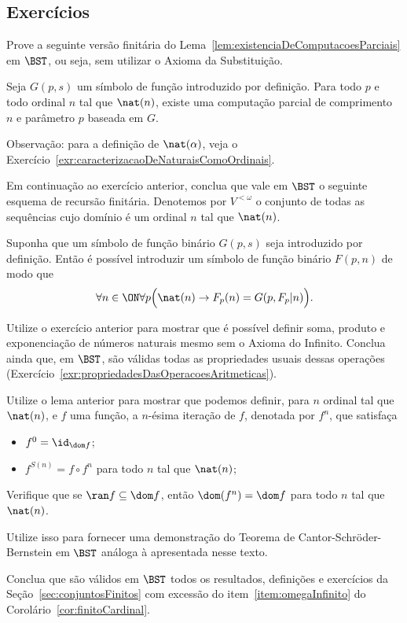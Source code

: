 \subsection*{Exercícios}

\begin{exercise}[$\BST$]
    Prove a seguinte versão finitária do Lema~\ref{lem:existenciaDeComputacoesParciais} em $\BST$, ou seja, sem utilizar o Axioma da Substituição.

    Seja $G(p, s)$ um símbolo de função introduzido por definição.
    Para todo $p$ e todo ordinal $n$ tal que $\nat(n)$, existe uma computação parcial de comprimento $n$ e parâmetro $p$ baseada em $G$.
    
    Observação: para a definição de $\nat(\alpha)$, veja o Exercício~\ref{exr:caracterizacaoDeNaturaisComoOrdinais}.
\end{exercise}

\begin{exercise}[$\BST$]
    Em continuação ao exercício anterior, conclua que vale em $\BST$ o seguinte esquema de recursão finitária.
    Denotemos por $V^{<\omega}$ o conjunto de todas as sequências cujo domínio é um ordinal $n$ tal que $\nat(n)$.

    Suponha que um símbolo de função binário $G(p, s)$ seja introduzido por definição.
    Então é possível introduzir um símbolo de função binário $F(p, n)$ de modo que
    \[
        \forall n \in \ON \forall p \Big( \nat(n)\rightarrow F_{p}(n)=G(p, F_p|n)\Big).
    \]
\end{exercise}

\begin{exercise}[$\BST$]
    Utilize o exercício anterior para mostrar que é possível definir soma, produto e exponenciação de números naturais mesmo sem o Axioma do Infinito.
    Conclua ainda que, em $\BST$, são válidas todas as propriedades usuais dessas operações (Exercício~\ref{exr:propriedadesDasOperacoesAritmeticas}).
\end{exercise}

\begin{exercise}[$\BST$]
    Utilize o lema anterior para mostrar que podemos definir, para $n$ ordinal tal que $\nat(n)$, e $f$ uma função, a $n$-ésima iteração de $f$, denotada por $f^n$, que satisfaça

    \begin{itemize}
        \item $f^0=\id_{\dom f}$;
        \item $f^{S(n)}=f\circ f^n$ para todo $n$ tal que $\nat(n)$;
    \end{itemize}

    Verifique que se $\ran f \subseteq \dom f$, então $\dom(f^n)=\dom f$ para todo $n$ tal que $\nat(n)$.

    Utilize isso para fornecer uma demonstração do Teorema de Cantor-Schröder-Bernstein em $\BST$ análoga à apresentada nesse texto.

    Conclua que são válidos em $\BST$ todos os resultados, definições e exercícios da Seção~\ref{sec:conjuntosFinitos} com excessão do item~\ref{item:omegaInfinito} do Corolário~\ref{cor:finitoCardinal}.
\end{exercise}